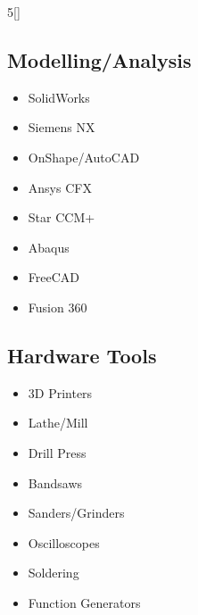 \begin{multicols}{5}[\vspace{5pt}]
    \subsection*{Modelling/Analysis}
    \begin{itemize}
        \item SolidWorks
        \item Siemens NX
        \item OnShape/AutoCAD
        \item Ansys CFX
        \item Star CCM+
        \item Abaqus
        \item FreeCAD
        \item Fusion 360
    \end{itemize}

    \subsection*{Hardware Tools}
    \begin{itemize}
        \item 3D Printers
        \item Lathe/Mill
        \item Drill Press
        \item Bandsaws
        \item Sanders/Grinders
        \item Oscilloscopes
        \item Soldering
        \item Function Generators
    \end{itemize}
\end{multicols}